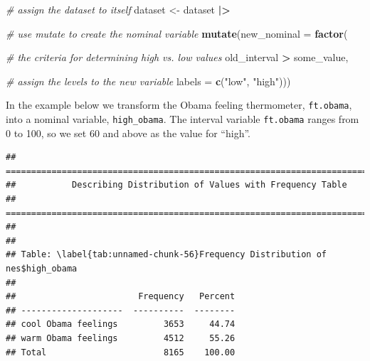 \documentclass[
]{book}
\newenvironment{Shaded}{\begin{snugshade}}{\end{snugshade}}
\newcommand{\AttributeTok}[1]{\textcolor[rgb]{0.13,0.29,0.53}{#1}}
\newcommand{\CommentTok}[1]{\textcolor[rgb]{0.56,0.35,0.01}{\textit{#1}}}
\newcommand{\DecValTok}[1]{\textcolor[rgb]{0.00,0.00,0.81}{#1}}
\newcommand{\FunctionTok}[1]{\textcolor[rgb]{0.13,0.29,0.53}{\textbf{#1}}}
\newcommand{\NormalTok}[1]{#1}
\newcommand{\OtherTok}[1]{\textcolor[rgb]{0.56,0.35,0.01}{#1}}
\newcommand{\SpecialCharTok}[1]{\textcolor[rgb]{0.81,0.36,0.00}{\textbf{#1}}}
\newcommand{\StringTok}[1]{\textcolor[rgb]{0.31,0.60,0.02}{#1}}
\begin{document}
\begin{Shaded}
\begin{Highlighting}[]
\CommentTok{\# assign the dataset to itself}
\NormalTok{dataset }\OtherTok{\textless{}{-}}\NormalTok{ dataset }\SpecialCharTok{|\textgreater{}}
  
  \CommentTok{\# use mutate to create the nominal variable}
  \FunctionTok{mutate}\NormalTok{(}\AttributeTok{new\_nominal =} \FunctionTok{factor}\NormalTok{(}
    
    \CommentTok{\# the criteria for determining high vs. low values}
\NormalTok{    old\_interval }\SpecialCharTok{\textgreater{}}\NormalTok{ some\_value,}
    
    \CommentTok{\# assign the levels to the new variable}
    \AttributeTok{labels =} \FunctionTok{c}\NormalTok{(}\StringTok{"low"}\NormalTok{, }\StringTok{"high"}\NormalTok{)))}
\end{Highlighting}
\end{Shaded}

In the example below we transform the Obama feeling thermometer, \texttt{ft.obama}, into a nominal variable, \texttt{high\_obama}. The interval variable \texttt{ft.obama} ranges from 0 to 100, so we set 60 and above as the value for ``high''.

\begin{Shaded}
\end{Shaded}

\begin{verbatim}
## ===========================================================================
##           Describing Distribution of Values with Frequency Table
## ===========================================================================
## 
## 
## Table: \label{tab:unnamed-chunk-56}Frequency Distribution of nes$high_obama
## 
##                        Frequency   Percent
## --------------------  ----------  --------
## cool Obama feelings         3653     44.74
## warm Obama feelings         4512     55.26
## Total                       8165    100.00
\end{verbatim}
\end{document}
